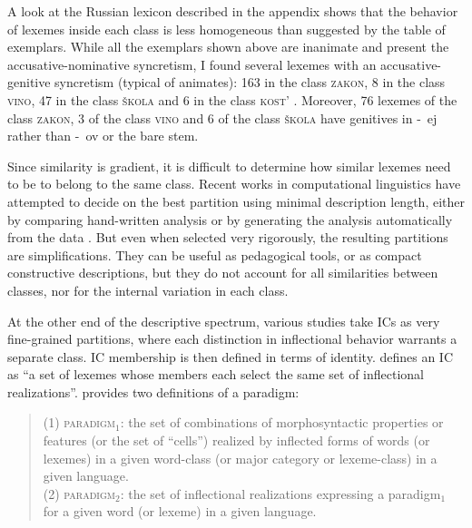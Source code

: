 \documentclass[output=paper]{langscibook}
\begin{document}
    A look at the Russian lexicon described in the appendix shows that the behavior of lexemes inside each class is less homogeneous than suggested by the table of exemplars. While all the exemplars shown above are inanimate and present the accusative-nominative syncretism, I found several lexemes with an accusative-genitive syncretism (typical of animates): 163 in the class \textsc{zakon}, 8 in the class \textsc{vino}, 47 in the class \textsc{škola} and 6 in the class \textsc{kost'} \citep[see][~129]{CorbettFraser1993}. Moreover, 76 lexemes of the class \textsc{zakon}, 3 of the class \textsc{vino} and 6 of the class \textsc{škola} have genitives in \unit{-ej} rather than \unit{-ov} or the bare stem. 
    
    Since similarity is gradient, it is difficult to determine how similar lexemes need to be to belong to the same class. Recent works in computational linguistics have attempted to decide on the best partition using minimal description length, either by comparing hand-written analysis \citep{WaltherSagot2011} or by generating the analysis automatically from the data \citep{BeniamineBonamiSagot2017}. But even when selected very rigorously, the resulting partitions are simplifications. They can be useful as pedagogical tools, or as compact constructive descriptions, but they do not account for all similarities between classes, nor for the internal variation in each class.
    
    At the other end of the descriptive spectrum, various studies take ICs as very fine-grained partitions, where each distinction in inflectional behavior warrants a separate class. IC membership is then defined in terms of identity. \citet[~64]{Aronoff1994} defines an IC as ``a set of lexemes whose members each select the same set of inflectional realizations''. \citet[~739]{Carstairs-McCarthy1994} provides two definitions of a paradigm:
    
    \blockquote{
        (1) \textsc{paradigm$_{1}$}: the set of combinations of morphosyntactic properties or features (or the set of ``cells'') realized by inflected forms of words (or lexemes) in a given word-class (or major category or lexeme-class) in a given language.\\
        (2) \textsc{paradigm$_{2}$}: the set of inflectional realizations expressing a paradigm$_{1}$ for a given word (or lexeme) in a given language.\\
    }
    
\end{document}
